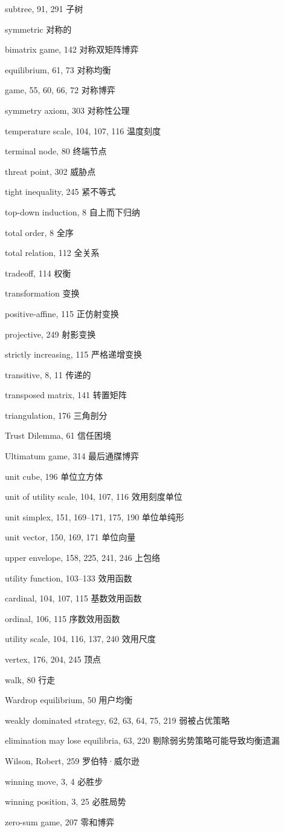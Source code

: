 subtree, 91, 291 子树  

symmetric 对称的  

\quad bimatrix game, 142 对称双矩阵博弈  

\quad equilibrium, 61, 73 对称均衡  

\quad game, 55, 60, 66, 72 对称博弈  

symmetry axiom, 303 对称性公理  

temperature scale, 104, 107, 116 温度刻度  

terminal node, 80 终端节点  

threat point, 302 威胁点  

tight inequality, 245 紧不等式  

top-down induction, 8 {\color{blue} 自上而下归纳  }

total order, 8 全序  

total relation, 112 全关系  

tradeoff, 114 权衡  

transformation 变换  

\quad positive-affine, 115 正仿射变换  

\quad projective, 249 射影变换  

\quad strictly increasing, 115 严格递增变换  

transitive, 8, 11 传递的  

transposed matrix, 141 转置矩阵  

triangulation, 176 三角剖分  

Trust Dilemma, 61 信任困境  

Ultimatum game, 314 最后通牒博弈  

unit cube, 196 单位立方体  

unit of utility scale, 104, 107, 116 效用刻度单位  

unit simplex, 151, 169–171, 175, 190 单位单纯形  

unit vector, 150, 169, 171 单位向量  

upper envelope, 158, 225, 241, 246 上包络  

utility function, 103–133 效用函数  

\quad cardinal, 104, 107, 115 基数效用函数  

\quad ordinal, 106, 115 序数效用函数  

utility scale, 104, 116, 137, 240 效用尺度  

vertex, 176, 204, 245 顶点  

walk, 80 行走  

Wardrop equilibrium, 50 {\color{blue}用户均衡 } 

weakly dominated strategy, 62, 63, 64, 75, 219 弱被占优策略  

\quad elimination may lose equilibria, 63, 220 剔除弱劣势策略可能导致均衡遗漏  

Wilson, Robert, 259 罗伯特·威尔逊

winning move, 3, 4 必胜步  

winning position, 3, 25 必胜局势  

zero-sum game, 207 零和博弈  





\footnotesize{
\printindex
}